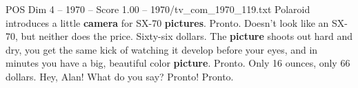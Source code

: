 \begin{textsample}{POS Dim 4 – 1970 – Score 1.00 – 1970/tv\_com\_1970\_119.txt}  \label{ex:f4_pos_037}
Polaroid introduces a little \textbf{camera} for SX-70 \textbf{pictures}.
Pronto.
Doesn't look like an SX-70, but neither does the price.
Sixty-six dollars.
The \textbf{picture} shoots out hard and dry, you get the same kick of watching it develop before your eyes, and in minutes you have a big, beautiful color \textbf{picture}.
Pronto.
Only 16 ounces, only 66 dollars.
Hey, Alan!
What do you say?
Pronto!
Pronto.

\end{textsample}
